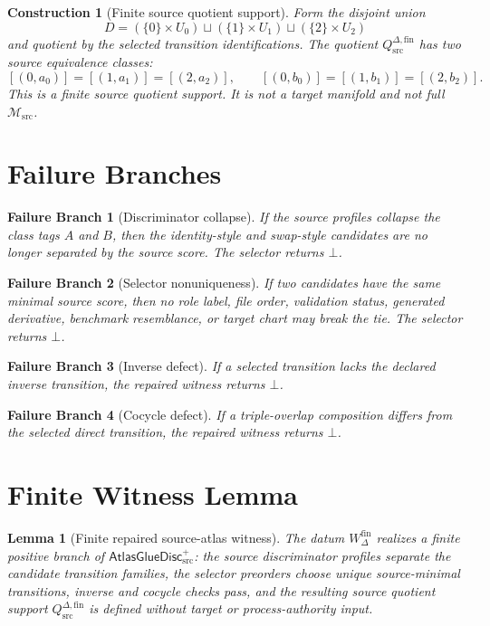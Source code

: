 \documentclass[11pt]{article}
\newcommand{\Msrc}{\mathcal{M}_{\mathrm{src}}}
\newcommand{\AtlasGlueDisc}{\mathsf{AtlasGlueDisc}_{\mathrm{src}}^{+}}
\newcommand{\Qdisc}{Q_{\mathrm{src}}^{\Delta,\mathrm{fin}}}
\newcommand{\Bot}{\bot}
\newcommand{\Wfin}{W_{\Delta}^{\mathrm{fin}}}
\newtheorem{construction}{Construction}
\newtheorem{lemma}{Lemma}
\newtheorem{failure}{Failure Branch}
\begin{document}
\begin{construction}[Finite source quotient support]
Form the disjoint union
\[
D=(\{0\}\times U_0)\sqcup(\{1\}\times U_1)\sqcup(\{2\}\times U_2)
\]
and quotient by the selected transition identifications. The quotient
\(\Qdisc\) has two source equivalence classes:
\[
[(0,a_0)]=[(1,a_1)]=[(2,a_2)],
\qquad
[(0,b_0)]=[(1,b_1)]=[(2,b_2)].
\]
This is a finite source quotient support. It is not a target manifold and not
full \(\Msrc\).
\end{construction}

\section{Failure Branches}

\begin{failure}[Discriminator collapse]
If the source profiles collapse the class tags \(A\) and \(B\), then the
identity-style and swap-style candidates are no longer separated by the
source score. The selector returns \(\Bot\).
\end{failure}

\begin{failure}[Selector nonuniqueness]
If two candidates have the same minimal source score, then no role label, file
order, validation status, generated derivative, benchmark resemblance, or
target chart may break the tie. The selector returns \(\Bot\).
\end{failure}

\begin{failure}[Inverse defect]
If a selected transition lacks the declared inverse transition, the repaired
witness returns \(\Bot\).
\end{failure}

\begin{failure}[Cocycle defect]
If a triple-overlap composition differs from the selected direct transition,
the repaired witness returns \(\Bot\).
\end{failure}

\section{Finite Witness Lemma}

\begin{lemma}[Finite repaired source-atlas witness]
The datum \(\Wfin\) realizes a finite positive branch of \(\AtlasGlueDisc\):
the source discriminator profiles separate the candidate transition families,
the selector preorders choose unique source-minimal transitions, inverse and
cocycle checks pass, and the resulting source quotient support \(\Qdisc\) is
defined without target or process-authority input.
\end{lemma}
\end{document}

